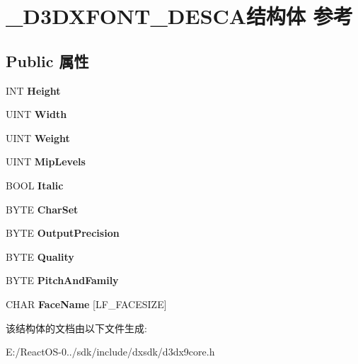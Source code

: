 \hypertarget{struct___d3_d_x_f_o_n_t___d_e_s_c_a}{}\section{\+\_\+\+D3\+D\+X\+F\+O\+N\+T\+\_\+\+D\+E\+S\+C\+A结构体 参考}
\label{struct___d3_d_x_f_o_n_t___d_e_s_c_a}
\subsection*{Public 属性}
\begin{DoxyCompactItemize}
\item 
\mbox{\label{struct___d3_d_x_f_o_n_t___d_e_s_c_a_a6fbc6149e38bf85ce4313eb18b4e66b4}} 
I\+NT {\bfseries Height}
\item 
\mbox{\label{struct___d3_d_x_f_o_n_t___d_e_s_c_a_ac2e1c97eecfe3d4d09a90b019a3d9862}} 
U\+I\+NT {\bfseries Width}
\item 
\mbox{\label{struct___d3_d_x_f_o_n_t___d_e_s_c_a_a50dfa0661a25bde4ecef887ebcd7081a}} 
U\+I\+NT {\bfseries Weight}
\item 
\mbox{\label{struct___d3_d_x_f_o_n_t___d_e_s_c_a_aa2556dbccd7addc163b9a5ccab89ba9f}} 
U\+I\+NT {\bfseries Mip\+Levels}
\item 
\mbox{\label{struct___d3_d_x_f_o_n_t___d_e_s_c_a_a12f2208b9d34acf2b5580ee6c215e56c}} 
B\+O\+OL {\bfseries Italic}
\item 
\mbox{\label{struct___d3_d_x_f_o_n_t___d_e_s_c_a_a80ee12de7011b64d9ae7ea8f232e94f8}} 
B\+Y\+TE {\bfseries Char\+Set}
\item 
\mbox{\label{struct___d3_d_x_f_o_n_t___d_e_s_c_a_a68f67d274f23e4ff79d965ad8f7fe19b}} 
B\+Y\+TE {\bfseries Output\+Precision}
\item 
\mbox{\label{struct___d3_d_x_f_o_n_t___d_e_s_c_a_a12b92c3940b743863b50f82ab6133f52}} 
B\+Y\+TE {\bfseries Quality}
\item 
\mbox{\label{struct___d3_d_x_f_o_n_t___d_e_s_c_a_a687219285c6830d25e44f234cf6228b3}} 
B\+Y\+TE {\bfseries Pitch\+And\+Family}
\item 
\mbox{\label{struct___d3_d_x_f_o_n_t___d_e_s_c_a_afe0caacbf0449010285f25aad2ff5f94}} 
C\+H\+AR {\bfseries Face\+Name} \mbox{[}L\+F\+\_\+\+F\+A\+C\+E\+S\+I\+ZE\mbox{]}
\end{DoxyCompactItemize}


该结构体的文档由以下文件生成\+:\begin{DoxyCompactItemize}
\item 
E\+:/\+React\+O\+S-\/0../sdk/include/dxsdk/d3dx9core.\+h\end{DoxyCompactItemize}
